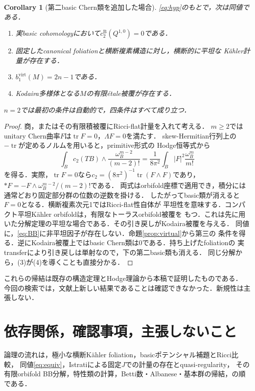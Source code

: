 \documentclass[12pt]{amsart}
\newtheorem{cor}[thm]{Corollary}
\theoremstyle{definition}
\theoremstyle{remark}
\numberwithin{equation}{section}
\DeclareMathOperator{\tr}{tr}
\newcommand{\bas}{\mathrm{B}}
\newcommand{\virt}{\mathrm{virt}}
\begin{document}
\begin{cor}[第二basic Chern類を追加した場合]\label{cor:c2}
\eqref{eq:hyp}のもとで，次は同値である．
\begin{enumerate}
\item 実basic cohomologyにおいて$c_2^{\bas}(Q^{1,0})=0$である．
\item 固定したcanonical foliationと横断複素構造に対し，横断的に平坦な
K\"ahler計量が存在する．
\item $b_1^{\virt}(M)=2n-1$である．
\item Kodaira多様体となる$M$の有限\'etale被覆が存在する．
\end{enumerate}
$n=2$では最初の条件は自動的で，四条件はすべて成り立つ．
\end{cor}
\begin{proof}
商，またはその有限積被覆にRicci-flat計量を入れて考える．
$m\geq2$ではunitary Chern曲率$F$は$\tr F=0$，$\Lambda F=0$を満たす．
skew-Hermitian行列上の$-\tr$が定めるノルムを用いると，primitive形式の
Hodge恒等式から
\begin{equation}\label{eq:c2}
\int_B c_2(TB)\wedge\frac{\omega_B^{m-2}}{(m-2)!}
=\frac1{8\pi^2}\int_B |F|^2\frac{\omega_B^m}{m!}
\end{equation}
を得る．実際，$\tr F=0$なら$c_2=(8\pi^2)^{-1}\tr(F\wedge F)$であり，
$*F=-F\wedge\omega_B^{m-2}/(m-2)!$である．
両式はorbifold座標で適用でき，積分には通常どおり固定部分群の位数の逆数を掛ける．
したがってbasic類が消えると$F=0$となる．横断複素次元1ではRicci-flat性自体が
平坦性を意味する．コンパクト平坦K\"ahler orbifoldは，有限なトーラスorbifold被覆を
もつ．これは先に用いた分解定理の平坦な場合である．その引き戻しがKodaira被覆を与える．
同値に，\eqref{eq:BB}に非平坦因子が存在しない．命題\ref{prop:virtual}から第三の
条件を得る．逆にKodaira被覆上ではbasic Chern類は0である．持ち上げたfoliationの
実transferにより引き戻しは単射なので，下の第二basic類も消える．
同じ分解から，(3)が(4)を導くことも直接分かる．
\end{proof}

これらの帰結は既存の構造定理とHodge理論から本稿で証明したものである．
今回の検索では，文献上新しい結果であることは確認できなかった．新規性は主張しない．

\appendix
\section{依存関係，確認事項，主張しないこと}\label{sec:audit}
論理の流れは，極小な横断K\"ahler foliation，basicポテンシャル補題とRicci比較，
同値\eqref{eq:equiv}，Istratiによる固定$J$での計量の存在とquasi-regularity，
その有限orbifold BB分解，特性類の計算，Betti数・Albanese・基本群の帰結，の順である．
\end{document}
